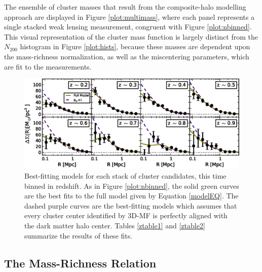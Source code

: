 The ensemble of cluster masses that result from the composite-halo modelling approach are displayed in Figure \ref{plot:multimass}, where each panel represents a single stacked weak lensing measurement, congruent with Figure \ref{plot:nbinned}. This visual representation of the cluster mass function is largely distinct from the $N_{200}$ histogram in Figure \ref{plot:hists}, because these masses are dependent upon the mass-richness normalization, as well as the miscentering parameters, which are fit to the measurements.


\begin{figure}
\begin{center}
  \includegraphics[scale=1.0]{plots_ch4/shearFit_zpanels_fcc0and1_slopeMN1p5_DuttonMaccio.eps}
  \caption[Shear for Redshift-Binned Clusters]{Best-fitting models for each stack of cluster candidates, this time binned in redshift. As in Figure \ref{plot:nbinned}, the solid green curves are the best fits to the full model given by Equation \ref{modelEQ}. The dashed purple curves are the best-fitting models which assumes that every cluster center identified by \ac{3D-MF} is perfectly aligned with the dark matter halo center. Tables \ref{ztable1} and \ref{ztable2} summarize the results of these fits.}
\label{plot:zbinned}
\end{center}
\end{figure}


\subsection{The Mass-Richness Relation}

